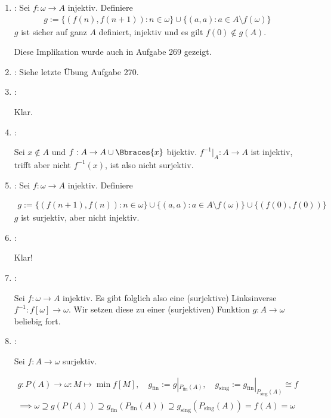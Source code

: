 \begin{solution}
\begin{enumerate}[label = \texttt{ad}]
\begin{enumerate}[label = \arabic*.]
	\end{enumerate}

	\item {}: Sei $f: \omega \to A$ injektiv.
	Definiere
	\begin{align*}
	g := \{(f(n),f(n+1)): n \in \omega\} \cup \{(a,a): a \in A \setminus f(\omega)\}
	\end{align*}
	$g$ ist sicher auf ganz $A$ definiert, injektiv und es gilt $f(0) \notin g(A)$.
	
	Diese Implikation wurde auch in Aufgabe 269 gezeigt.
	
	\item {}: Siehe letzte Übung Aufgabe 270.
	
	\item {}:
	
	Klar.
	
	\item {}:
	
	Sei $x \not \in A$ und $f: A \to A \cup \Bbraces{x}$ bijektiv.
	$f^{-1} |_A: A \to A$ ist injektiv, trifft aber nicht $f^{-1}(x)$, ist also nicht surjektiv.
	
	\item {}: Sei $f: \omega \to A$ injektiv. Definiere
	
	\begin{align*}
	g := \{(f(n+1),f(n)): n \in \omega\} \cup \{(a,a): a \in A \setminus f(\omega)\}
	\cup \{(f(0),f(0))\}
	\end{align*}
	$g$ ist surjektiv, aber nicht injektiv.
	
	\item {}:
	
	Klar!
	
	\item {}:
	
	Sei $f: \omega \to A$ injektiv.
	Es gibt folglich also eine (surjektive) Linksinverse $f^{-1}: f[\omega] \to \omega$.
	Wir setzen diese zu einer (surjektiven) Funktion $g: A \to \omega$ beliebig fort.
	
	\item {}:
	
	Sei $f: A \to \omega$ surjektiv.
	
	\begin{gather*}
	g:
	P(A) \to \omega:
	M \mapsto \min f[M],
	\quad
	g_\mathrm{fin} := g |_{P_\mathrm{fin}(A)},
	\quad
	g_\mathrm{sing} := g_\mathrm{fin} |_{P_\mathrm{sing}(A)} \cong f \\
	\implies
	\omega
	\supseteq
	g(P(A))
	\supseteq
	g_\mathrm{fin}(P_\mathrm{fin}(A))
	\supseteq
	g_\mathrm{sing}(P_\mathrm{sing}(A))
	=
	f(A)
	=
	\omega
	\end{gather*}
	

\end{enumerate}
\end{solution}
